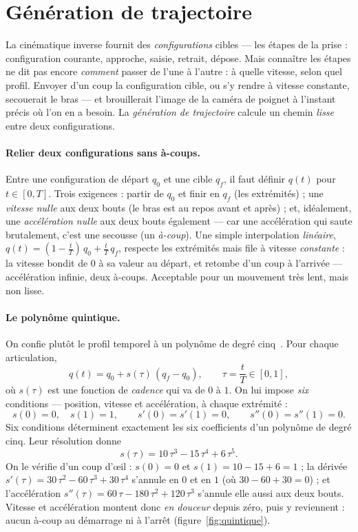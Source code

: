 \section{Génération de trajectoire}
\label{sec:trajectoire}

La cinématique inverse fournit des \emph{configurations} cibles --- les étapes de la prise : configuration courante, approche, saisie, retrait, dépose. Mais connaître les étapes ne dit pas encore \emph{comment} passer de l'une à l'autre : à quelle vitesse, selon quel profil. Envoyer d'un coup la configuration cible, ou s'y rendre à vitesse constante, secouerait le bras --- et brouillerait l'image de la caméra de poignet à l'instant précis où l'on en a besoin. La \emph{génération de trajectoire} calcule un chemin \emph{lisse} entre deux configurations.

\paragraph{Relier deux configurations sans à-coups.} Entre une configuration de départ $q_0$ et une cible $q_f$, il faut définir $q(t)$ pour $t \in [0, T]$. Trois exigences : partir de $q_0$ et finir en $q_f$ (les extrémités) ; une \emph{vitesse nulle} aux deux bouts (le bras est au repos avant et après) ; et, idéalement, une \emph{accélération nulle} aux deux bouts également --- car une accélération qui saute brutalement, c'est une secousse (un \emph{à-coup}). Une simple interpolation \emph{linéaire}, $q(t) = (1 - \tfrac{t}{T})\,q_0 + \tfrac{t}{T}\,q_f$, respecte les extrémités mais file à vitesse \emph{constante} : la vitesse bondit de $0$ à sa valeur au départ, et retombe d'un coup à l'arrivée --- accélération infinie, deux à-coups. Acceptable pour un mouvement très lent, mais non lisse.

\paragraph{Le polynôme quintique.} On confie plutôt le profil temporel à un polynôme de degré cinq~\cite{siciliano_robotics_2009}. Pour chaque articulation,
\[
  q(t) = q_0 + s(\tau)\,(q_f - q_0), \qquad \tau = \frac{t}{T} \in [0, 1],
\]
où $s(\tau)$ est une fonction de \emph{cadence} qui va de $0$ à $1$. On lui impose \emph{six} conditions --- position, vitesse et accélération, à chaque extrémité :
\[
  s(0) = 0,\quad s(1) = 1, \qquad s'(0) = s'(1) = 0, \qquad s''(0) = s''(1) = 0 .
\]
Six conditions déterminent exactement les six coefficients d'un polynôme de degré cinq. Leur résolution donne
\[
  s(\tau) = 10\,\tau^3 - 15\,\tau^4 + 6\,\tau^5 .
\]
On le vérifie d'un coup d'œil : $s(0) = 0$ et $s(1) = 10 - 15 + 6 = 1$ ; la dérivée $s'(\tau) = 30\,\tau^2 - 60\,\tau^3 + 30\,\tau^4$ s'annule en $0$ et en $1$ (où $30 - 60 + 30 = 0$) ; et l'accélération $s''(\tau) = 60\,\tau - 180\,\tau^2 + 120\,\tau^3$ s'annule elle aussi aux deux bouts. Vitesse et accélération montent donc \emph{en douceur} depuis zéro, puis y reviennent : aucun à-coup au démarrage ni à l'arrêt (figure~\ref{fig:quintique}).

